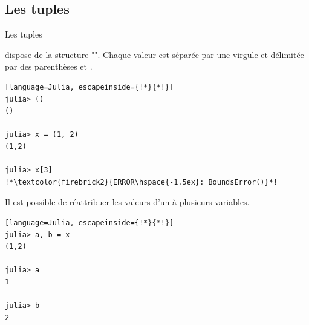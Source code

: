\subsection{Les tuples}
\begin{frame}[containsverbatim]{Les tuples}
\par{\Julia{} dispose de la structure "". Chaque valeur est séparée par une virgule \cmdb{,} et délimitée par des parenthèses \cmdb{(} et \cmdb{)}.}
\begin{lstlisting}[language=Julia, escapeinside={!*}{*!}]
julia> ()
()

julia> x = (1, 2)
(1,2)

julia> x[3]
!*\textcolor{firebrick2}{ERROR\hspace{-1.5ex}: BoundsError()}*!
\end{lstlisting}
\par{Il est possible de réattribuer les valeurs d'un  à plusieurs variables.}
\begin{lstlisting}[language=Julia, escapeinside={!*}{*!}]
julia> a, b = x
(1,2)

julia> a
1

julia> b
2

\end{lstlisting}
\end{frame}


